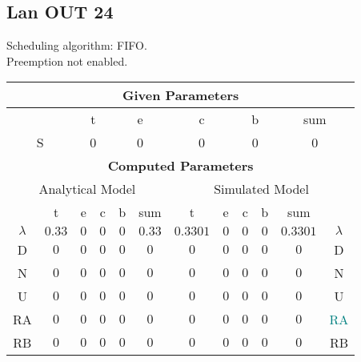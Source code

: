 \documentclass{article}
\begin{document}
\subsection{Lan OUT 24}
Scheduling algorithm: FIFO.\\Preemption not enabled. \\\begin{table}[H]\centering\begin{tabular}{@{}c|cccc|c||cccc|c|c@{}}\toprule\multicolumn{12}{c}{\textbf{Given Parameters}}\\\midrule\multicolumn{2}{c|}{ } & \multicolumn{2}{c}{t} & \multicolumn{2}{c}{e} & \multicolumn{2}{c}{c} & \multicolumn{2}{c}{b} & \multicolumn{2}{|c}{sum} \\ \midrule\multicolumn{2}{c|}{S} & \multicolumn{2}{c}{0} & \multicolumn{2}{c}{0} & \multicolumn{2}{c}{0} & \multicolumn{2}{c}{0} & \multicolumn{2}{|c}{0}\\ \midrule\midrule\multicolumn{12}{c}{\textbf{Computed Parameters}}\\ \midrule\multicolumn{6}{c||}{Analytical Model} & \multicolumn{6}{c}{Simulated Model}\\ 
 \midrule & t & e & c & b & sum & t & e & c & b & sum &  \\ \midrule$\lambda$ &$0.33$ & $0$ & $0$ & $0$ & $0.33$ & $0.3301$ & $0$ & $0$ & $0$ & $0.3301$& $\lambda$ \\D & $0$ & $0$ & $0$ & $0$ & $0$ & $0$ & $0$ & $0$ & $0$ & $0$& D\\N & $0$ & $0$ & $0$ & $0$ & $0$ & $0$ & $0$ & $0$ & $0$ & $0$& N\\U & $0$ & $0$ & $0$ & $0$ & $0$ & $0$ & $0$ & $0$ & $0$ & $0$& U\\RA & $0$ & $0$ & $0$ & $0$ & $0$ & $0$ & $0$ & $0$ & $0$ & $0$& \textcolor{teal}{RA}\\RB & $0$ & $0$ & $0$ & $0$ & $0$ & $0$ & $0$ & $0$ & $0$ & $0$& RB\\
\bottomrule
\end{tabular}
\end{table}
\filbreak
\end{document}
